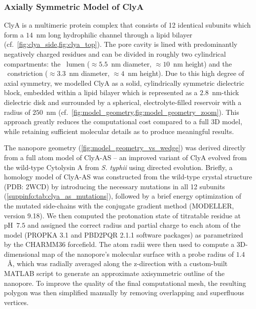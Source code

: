 \documentclass[journal=ancac3,manuscript=article,etalmode=truncate,maxauthors=0,layout=twocolumn]{achemso}
\begin{document}
\subsubsection{Axially Symmetric Model of ClyA}
ClyA is a multimeric protein complex that consists of 12 identical subunits which form a $14$~nm long 
hydrophilic channel through a lipid bilayer (cf.~\cref{fig:clya_side,fig:clya_top}). The pore cavity is lined 
with predominantly negatively charged residues and can be divided in roughly two cylindrical compartments: 
the \cis\ lumen ($\approx5.5$~nm diameter, $\approx10$~nm height) and the \trans\ constriction 
($\approx3.3$~nm diameter, $\approx4$~nm height). Due to this high degree of axial symmetry, we modelled ClyA 
as a solid, cylindrically symmetric dielectric block, embedded within a lipid bilayer which is represented as 
a $2.8$~nm-thick\cite{Kucerka-2011} dielectric disk  and surrounded by a spherical, electrolyte-filled 
reservoir with a radius of $250$~nm 
(cf.~\cref{fig:model_geometry,fig:model_geometry_zoom})\cite{Lu-2012,Pederson-2015}. This approach greatly 
reduces the computational cost compared to a full 3D model, while retaining sufficient molecular details as 
to produce meaningful results.

The nanopore geometry (\cref{fig:model_geometry_vs_wedge}) was derived directly from a full atom model of 
ClyA-AS -- an improved variant of ClyA evolved from the wild-type Cytolysin A from \textit{S. typhii} using 
directed evolution.\cite{Soskine-2013} Briefly, a homology model of ClyA-AS was constructed from the 
wild-type crystal structure (PDB: 2WCD)\cite{Mueller-2009} by introducing the necessary mutations in all 12 
subunits (\cref{suppinfo:tab:clya_as_mutations}), followed by a brief energy optimization of the mutated 
side-chains with the conjugate gradient method (MODELLER, version 9.18).\cite{Sali-1993} We then computed the 
protonation state of titratable residue at pH~$7.5$ and assigned the correct radius and partial charge to 
each atom of the model (PROPKA 3.1\cite{Olsson-2011} and PBD2PQR 2.1.1\cite{Jurrus-2018} software packages) 
as parametrized by the CHARMM36 forcefield.\cite{Best-2012} The atom radii were then used to compute a 
3D-dimensional map of the nanopore's molecular surface with a probe radius of $1.4$~\AA, which was radially 
averaged along the z-direction with a custom-built MATLAB script to generate an approximate axisymmetric 
outline of the nanopore. To improve the quality of the final computational mesh, the resulting polygon was 
then simplified manually by removing overlapping and superfluous vertices.
\end{document}
